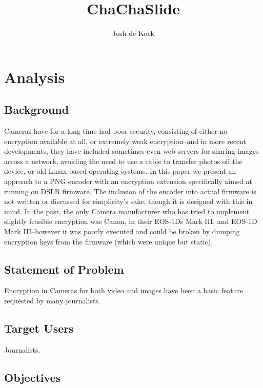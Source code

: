 \documentclass{report}
\begin{document}
\title{ChaChaSlide}
\author{Josh de Kock}

\maketitle

\tableofcontents
\clearpage

\chapter{Analysis}

\section{Background}
Cameras have for a long time had poor security, consisting of either no encryption available at all, or extremely weak encryption--and in more recent developments, they have included sometimes even web-servers for sharing images across a network, avoiding the need to use a cable to transfer photos off the device, or old Linux-based operating systems. In this paper we present an approach to a PNG encoder with an encryption extension specifically aimed at running on DSLR firmware. The inclusion of the encoder into actual firmware is not written or discussed for simplicity's sake, though it is designed with this in mind.
In the past, the only Camera manufacturer who has tried to implement slightly feasible encryption was Canon, in their EOS-1Ds Mark III, and EOS-1D Mark III\cite{canonenc}--however it was poorly executed and could be broken by dumping encryption keys from the firmware (which were unique but static)\cite{stackoverflow}.

\section{Statement of Problem}

Encryption in Cameras for both video and images have been a basic feature requested by many journalists\cite{freedompress}. 

\section{Target Users}

Journalists.

\section{Objectives}
\end{document}
